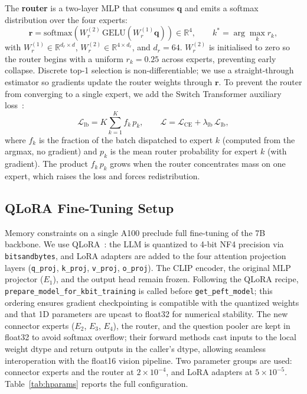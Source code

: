 \documentclass{article}
\begin{document}
The \textbf{router} is a two-layer MLP that consumes $\mathbf{q}$ and emits a softmax distribution over the four experts:
\begin{equation}
  \mathbf{r} = \mathrm{softmax}\!\left(W_r^{(2)}\,\mathrm{GELU}\!\left(W_r^{(1)} \mathbf{q}\right)\right) \in \mathbb{R}^4,
  \qquad k^* = \arg\max_k r_k,
  \label{eq:router}
\end{equation}
with $W_r^{(1)} \in \mathbb{R}^{d_r \times d}$, $W_r^{(2)} \in \mathbb{R}^{4 \times d_r}$, and $d_r = 64$. $W_r^{(2)}$ is initialised to zero so the router begins with a uniform $r_k = 0.25$ across experts, preventing early collapse. Discrete top-1 selection is non-differentiable; we use a straight-through estimator so gradients update the router weights through $\mathbf{r}$. To prevent the router from converging to a single expert, we add the Switch Transformer auxiliary loss~\citep{fedus2022switch}:
\begin{equation}
  \mathcal{L}_{\text{lb}} = K \sum_{k=1}^{K} f_k\, p_k,
  \qquad
  \mathcal{L} = \mathcal{L}_{\text{CE}} + \lambda_{\text{lb}}\, \mathcal{L}_{\text{lb}},
  \label{eq:lb}
\end{equation}
where $f_k$ is the fraction of the batch dispatched to expert $k$ (computed from the argmax, no gradient) and $p_k$ is the mean router probability for expert $k$ (with gradient). The product $f_k\,p_k$ grows when the router concentrates mass on one expert, which raises the loss and forces redistribution.

\subsection{QLoRA Fine-Tuning Setup}

Memory constraints on a single A100 preclude full fine-tuning of the 7B backbone. We use QLoRA~\citep{dettmers2023qlora}: the LLM is quantized to 4-bit NF4 precision via \texttt{bitsandbytes}, and LoRA adapters are added to the four attention projection layers (\texttt{q\_proj}, \texttt{k\_proj}, \texttt{v\_proj}, \texttt{o\_proj}). The CLIP encoder, the original MLP projector ($E_1$), and the output head remain frozen. Following the QLoRA recipe, \texttt{prepare\_model\_for\_kbit\_training} is called before \texttt{get\_peft\_model}; this ordering ensures gradient checkpointing is compatible with the quantized weights and that 1D parameters are upcast to float32 for numerical stability. The new connector experts ($E_2$, $E_3$, $E_4$), the router, and the question pooler are kept in float32 to avoid softmax overflow; their forward methods cast inputs to the local weight dtype and return outputs in the caller's dtype, allowing seamless interoperation with the float16 vision pipeline. Two parameter groups are used: connector experts and the router at $2 \times 10^{-4}$, and LoRA adapters at $5 \times 10^{-5}$. Table~\ref{tab:hparams} reports the full configuration.
\end{document}
